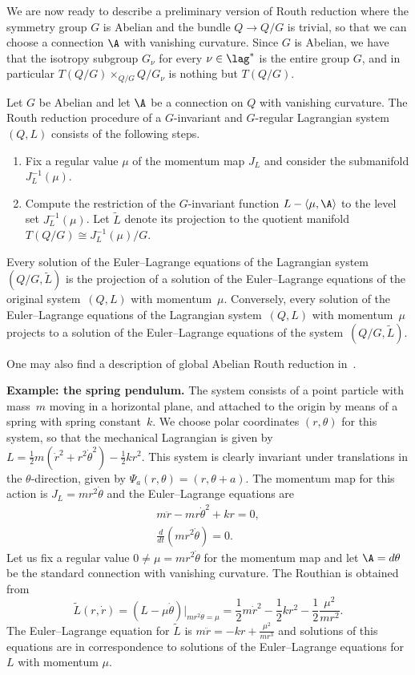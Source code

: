 We are now ready to describe a preliminary version of Routh reduction where the symmetry group $G$ is Abelian and the bundle $Q\to Q/G$ is trivial, so that we can choose a connection $\A$ with vanishing curvature.  Since $G$ is Abelian, we have that the isotropy subgroup $G_\nu$ for every $\nu \in \lag^*$ is the entire group $G$, and in particular $T(Q/G)\times_{Q/G} Q/G_\nu$ is nothing but $T(Q/G)$.
\begin{theorem} Let $G$ be Abelian and let $\A$ be a connection on $Q$ with vanishing curvature. The Routh reduction procedure of a $G$-invariant and $G$-regular Lagrangian system $(Q,L)$ consists of the following steps.
\begin{enumerate}\itemsep=0pt
\item[$1.$] Fix a regular value $\mu$ of the momentum map $J_L$ and consider the submanifold $
J^{-1}_L(\mu)$.
\item[$2.$] Compute the restriction of the $G$-invariant function $L-\langle \mu , \A \rangle$ to the level set $J^{-1}_L(\mu)$. Let $\tilde L$ denote its projection to the quotient manifold $T(Q/G)\cong J^{-1}_L(\mu)/G$.
\end{enumerate}
Every solution of the Euler--Lagrange equations of the Lagrangian system $(Q/G,\tilde L)$ is the projection of a solution of the Euler--Lagrange equations of the original system~$(Q,L)$ with momentum~$\mu$. Conversely, every solution of the Euler--Lagrange equations of the Lagrangian system~$(Q,L)$ with momentum~$\mu$ projects to a solution of the Euler--Lagrange equations of the system~$(Q/G,\tilde L)$.
\end{theorem}
One may also f\/ind a description of global Abelian Routh reduction in~\cite{arnold}.

{\bf Example: the spring pendulum.} The system consists of a point particle with mass~$m$ moving in a horizontal plane, and attached to the origin by means of a spring with spring constant~$k$.  We choose polar coordinates $(r,\theta)$ for this system, so that the mechanical Lagrangian is given by $L = \frac12 m (\dot r^2+ r^2\dot\theta^2)  - \frac12 k r^2$.  This system is clearly invariant under translations in the $\theta$-direction, given by  $\Psi_{a}(r,\theta) = (r,\theta+a)$. The momentum map for this action is $J_L=mr^2\dot\theta$ and the Euler--Lagrange equations are
\begin{gather*} m\ddot r - mr\dot\theta^2+kr =0,\\
\frac{d}{dt} (mr^2\dot\theta)= 0.
\end{gather*}
Let us f\/ix a regular value $0\neq\mu=mr^2\dot\theta$ for the momentum map and let $\A = d\theta$ be the standard connection with vanishing curvature. The Routhian is obtained from \[\tilde L(r,\dot r)=(L-\mu\dot\theta)|_{mr^2\dot\theta=\mu} = \frac12 m\dot r^2 -\frac12 k r^2 - \frac12\frac{\mu^2}{mr^2}.\]
The Euler--Lagrange equation for $\tilde L$ is $m\ddot r =- kr + \frac{\mu^2}{mr^3}$ and solutions of this equations are in correspondence to solutions of the Euler--Lagrange equations for $L$ with momentum $\mu$.


